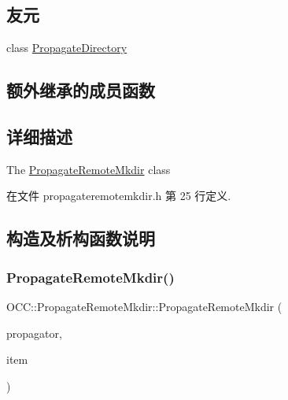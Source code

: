 \subsection*{友元}
\begin{DoxyCompactItemize}
\item 
class \hyperlink{class_o_c_c_1_1_propagate_remote_mkdir_a618ad365a131b514f7ee1c324b844ff4}{Propagate\+Directory}
\end{DoxyCompactItemize}
\subsection*{额外继承的成员函数}


\subsection{详细描述}
The \hyperlink{class_o_c_c_1_1_propagate_remote_mkdir}{Propagate\+Remote\+Mkdir} class 

在文件 propagateremotemkdir.\+h 第 25 行定义.



\subsection{构造及析构函数说明}
\mbox{\label{class_o_c_c_1_1_propagate_remote_mkdir_a2eb75587507679e35f1b0b09bd3540e2}} 
\subsubsection{\texorpdfstring{Propagate\+Remote\+Mkdir()}{PropagateRemoteMkdir()}}
{\footnotesize\ttfamily O\+C\+C\+::\+Propagate\+Remote\+Mkdir\+::\+Propagate\+Remote\+Mkdir (\begin{DoxyParamCaption}\item[{\hyperlink{class_o_c_c_1_1_owncloud_propagator}{Owncloud\+Propagator} $\ast$}]{propagator,  }\item[{const \hyperlink{namespace_o_c_c_acb6b0db82893659fbd0c98d3c5b8e2b8}{Sync\+File\+Item\+Ptr} \&}]{item }\end{DoxyParamCaption})}



